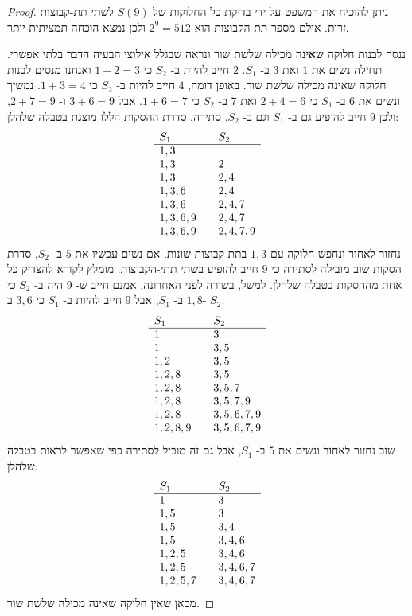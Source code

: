\begin{proof}
ניתן להוכיח את המשפט על ידי בדיקת כל החלוקות של 
$S(9)$
לשתי תת-קבוצות זרות. אולם מספר תת-הקבוצות הוא 
$2^9=512$
ולכן נמצא הוכחה תמציתית יותר.

ננסה לבנות חלוקה 
\textbf{שאינה}
מכילה שלשת שור
ונראה שבגלל אילוצי הבעיה הדבר בלתי אפשרי. תחילה נשים את
$1$
ואת
$3$
ב-%
$S_1$.
$2$
חייב להיות ב-%
$S_2$
כי
$1+2=3$
ואנחנו מנסים לבנות חלוקה שאינה מכילה שלשת שור. 
באופן דומה, 
$4$
חייב להיות ב-%
$S_2$
כי
$1+3=4$.
נמשיך ונשים את
$6$
ב-%
$S_1$
כי
$2+4=6$
ואת
$7$
ב-%
$S_2$
כי
$1+6=7$.
אבל
$3+6=9$
ו-%
$2+7=9$,
ולכן
$9$
חייב להופיע גם ב-%
$S_1$
וגם ב-%
$S_2$, 
סתירה. סדרת ההסקות הללו מוצגת בטבלה שלהלן:
\[
\begin{array}{l@{\hspace{2em}}l}
S_1&S_2\\\hline
1,3 & \\
1,3 & 2\\
1,3 & 2,4\\
1,3,6 & 2,4\\
1,3,6 & 2,4,7\\
1,3,6,9 & 2,4,7\\
1,3,6,9 & 2,4,7,9
\end{array}
\]
נחזור לאחור ונחפש חלוקה עם 
$1,3$
בתת-קבוצות שונות.  אם נשים עכשיו את 
$5$
ב-%
$S_2$, 
סדרת הסקות שוב מובילה לסתירה כי 
$9$
חייב להופיע בשתי תתי-הקבוצות. מומלץ לקורא להצדיק כל אחת מההסקות בטבלה שלהלן. למשל, בשורה לפני האחרונה, אמנם חייב ש-%
$9$
היה ב-%
$S_2$
כי 
$1,8$
ב-%
$S_1$,
אבל 
$9$
חייב להיות ב-%
$S_1$
כי 
$3,6$
ב-%
$S_2$.
\[
\begin{array}{l@{\hspace{2em}}l}
S_1&S_2\\\hline
1&3\\
1 & 3,5\\
1,2&3,5\\
1,2,8&3,5\\
1,2,8&3,5,7\\
1,2,8&3,5,7,9\\
1,2,8&3,5,6,7,9\\
1,2,8,9&3,5,6,7,9
\end{array}
\]
שוב נחזור לאחור ונשים את 
$5$
ב-%
$S_1$,
אבל גם זה מוביל לסתירה כפי שאפשר לראות בטבלה שלהלן:
\[
\begin{array}{l@{\hspace{2em}}l}
S_1&S_2\\\hline
1&3\\
1,5& 3\\
1,5&3,4\\
1,5&3,4,6\\
1,2,5&3,4,6\\
1,2,5&3,4,6,7\\
1,2,5,7&3,4,6,7
\end{array}
\]
מכאן שאין חלוקה שאינה מכילה שלשת שור.
\end{proof}

